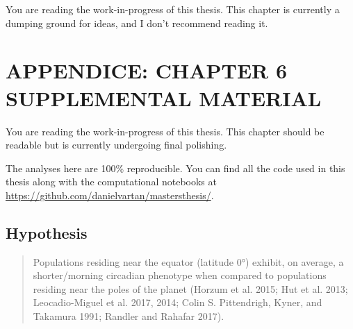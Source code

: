 \documentclass[
  12pt,
  a4paper,
  oneside]{tesesusp}
\begin{document}
\begin{tcolorbox}[enhanced jigsaw, rightrule=.15mm, colback=white, colbacktitle=quarto-callout-important-color!10!white, toptitle=1mm, bottomtitle=1mm, toprule=.15mm, bottomrule=.15mm, colframe=quarto-callout-important-color-frame, opacitybacktitle=0.6, opacityback=0, coltitle=black, left=2mm, breakable, titlerule=0mm, title=\textcolor{quarto-callout-important-color}{\faExclamation}\hspace{0.5em}{Important}, arc=.35mm, leftrule=.75mm]

You are reading the work-in-progress of this thesis. This chapter is
currently a dumping ground for ideas, and I don't recommend reading it.

\end{tcolorbox}

\hypertarget{appendice-chapter-6-supplemental-material}{%
\chapter{APPENDICE: CHAPTER 6 SUPPLEMENTAL
MATERIAL}\label{appendice-chapter-6-supplemental-material}}

\begin{tcolorbox}[enhanced jigsaw, rightrule=.15mm, colback=white, colbacktitle=quarto-callout-note-color!10!white, toptitle=1mm, bottomtitle=1mm, toprule=.15mm, bottomrule=.15mm, colframe=quarto-callout-note-color-frame, opacitybacktitle=0.6, opacityback=0, coltitle=black, left=2mm, breakable, titlerule=0mm, title=\textcolor{quarto-callout-note-color}{\faInfo}\hspace{0.5em}{Note}, arc=.35mm, leftrule=.75mm]

You are reading the work-in-progress of this thesis. This chapter should
be readable but is currently undergoing final polishing.

\end{tcolorbox}

The analyses here are 100\% reproducible. You can find all the code used
in this thesis along with the computational notebooks at
\url{https://github.com/danielvartan/mastersthesis/}.

\hypertarget{hypothesis}{%
\section{Hypothesis}\label{hypothesis}}

\begin{quote}
Populations residing near the equator (latitude 0°) exhibit, on average,
a shorter/morning circadian phenotype when compared to populations
residing near the poles of the planet (Horzum et al. 2015; Hut et al.
2013; Leocadio-Miguel et al. 2017, 2014; Colin S. Pittendrigh, Kyner,
and Takamura 1991; Randler and Rahafar 2017).
\end{quote}
\end{document}
